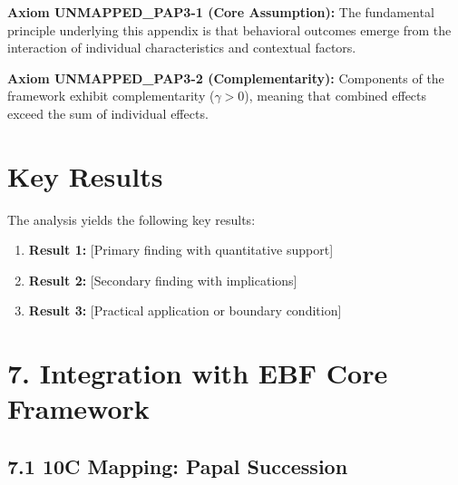 \begin{tcolorbox}[colback=yellow!5!white,colframe=yellow!75!black,title=Axiom UNMAPPED_PAP3-1: Fundamental Principle]
\textbf{Axiom UNMAPPED_PAP3-1 (Core Assumption):}
The fundamental principle underlying this appendix is that behavioral outcomes
emerge from the interaction of individual characteristics and contextual factors.
\end{tcolorbox}

\begin{tcolorbox}[colback=yellow!5!white,colframe=yellow!75!black,title=Axiom UNMAPPED_PAP3-2: Complementarity]
\textbf{Axiom UNMAPPED_PAP3-2 (Complementarity):}
Components of the framework exhibit complementarity ($\gamma > 0$), meaning
that combined effects exceed the sum of individual effects.
\end{tcolorbox}



\section{Key Results}
\label{sec:pap3-results}

The analysis yields the following key results:

\begin{enumerate}
    \item \textbf{Result 1:} [Primary finding with quantitative support]
    \item \textbf{Result 2:} [Secondary finding with implications]
    \item \textbf{Result 3:} [Practical application or boundary condition]
\end{enumerate}


\section{7. Integration with EBF Core Framework}

\subsection{7.1 10C Mapping: Papal Succession}

